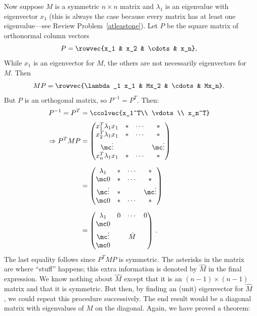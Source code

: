 Now suppose $M$ is a symmetric $n\times n$ matrix and $\lambda_1$ is an eigenvalue with eigenvector $x_1$ (this is always the case because every matrix has at least one eigenvalue---see Review Problem~\ref{atleastone}).  
Let $P$ be the square matrix of orthonormal column vectors 
\[
P=\rowvec{x_1 & x_2 & \cdots & x_n},
\]
While $x_1$ is an eigenvector for $M$, the others are not necessarily eigenvectors for $M$.  
Then
\[
MP=\rowvec{\lambda_1 x_1 & Mx_2 & \cdots & Mx_n}.
\]
But $P$ is an orthogonal matrix, so $P^{-1}=P^T$.  Then:
\begin{align*}
P^{-1}=P^T &= \ccolvec{x_1^T\\ \vdots \\ x_n^T} \\[1mm]
\Rightarrow P^TMP &= \begin{pmatrix}
  x_1^T\lambda_1x_1  & * & \cdots & *\\
  x_2^T\lambda_1x_1  & * & \cdots & *\\
  \mc\vdots             &   & & \mc\vdots\\
   x_n^T\lambda_1x_1 & * & \cdots & *\\
  \end{pmatrix}\\[2mm]
&= \begin{pmatrix}
  \lambda_1  & * & \cdots & *\\
  \mc 0  & * & \cdots & *\\
 \mc \vdots             & *  & & \mc\vdots\\
  \mc 0 & * & \cdots & *\\
  \end{pmatrix}\\[2mm]
&= \begin{pmatrix}
  \lambda_1  & 0 & \cdots & 0\\
  \mc 0          & & & \\
  \mc\vdots     & & \hat{M} & \\
  \mc0          & & & \\
  \end{pmatrix}\, .\\
\end{align*}
The last equality follows since $P^TMP$ is symmetric.  The asterisks in the matrix are where ``stuff'' happens; this extra information is denoted by $\hat{M}$ in the final expression.  We know nothing about $\hat{M}$ except that it is an $(n-1)\times (n-1)$ matrix and that it is symmetric.  But then, by finding an (unit) eigenvector for $\hat{M}$, we could repeat this procedure successively.  The end result would be a diagonal matrix with eigenvalues of $M$ on the diagonal. Again, we have proved a theorem: %

